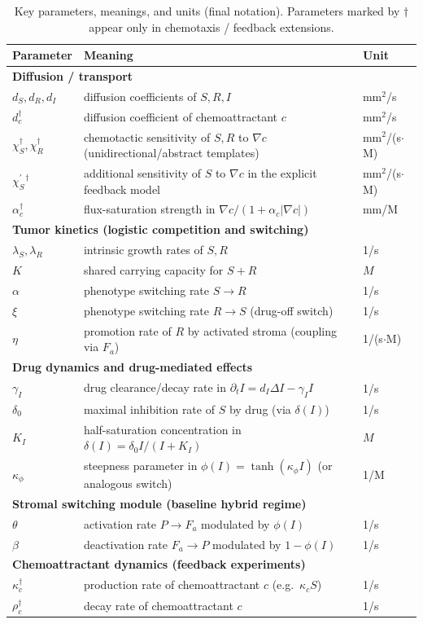 \documentclass[pdflatex,sn-mathphys-ay]{sn-jnl}
\theoremstyle{thmstyleone}
\theoremstyle{definition}
\theoremstyle{remark}
\begin{document}
\begin{table}[htbp]
\centering
\caption{Key parameters, meanings, and units (final notation). Parameters marked by $\dagger$ appear only in chemotaxis / feedback extensions.}
\label{tab:parameter_units}
\begin{tabular}{lll}
\toprule
Parameter & Meaning & Unit \\
\midrule
\multicolumn{3}{l}{\textbf{Diffusion / transport}}\\
$d_S,d_R,d_I$ & diffusion coefficients of $S,R,I$ & mm$^2$/s \\
$d_c^\dagger$ & diffusion coefficient of chemoattractant $c$ & mm$^2$/s \\
$\chi_S^\dagger,\chi_R^\dagger$ & chemotactic sensitivity of $S,R$ to $\nabla c$ (unidirectional/abstract templates) & mm$^2$/(s$\cdot$M) \\
$\chi_S^{\prime\,\dagger}$ & additional sensitivity of $S$ to $\nabla c$ in the explicit feedback model & mm$^2$/(s$\cdot$M) \\
$\alpha_c^\dagger$ & flux-saturation strength in $\nabla c/(1+\alpha_c|\nabla c|)$ & mm/M \\
\midrule
\multicolumn{3}{l}{\textbf{Tumor kinetics (logistic competition and switching)}}\\
$\lambda_S,\lambda_R$ & intrinsic growth rates of $S,R$ & 1/s \\
$K$ & shared carrying capacity for $S+R$ & $M$ \\
$\alpha$ & phenotype switching rate $S\to R$ & 1/s \\
$\xi$ & phenotype switching rate $R\to S$ (drug-off switch) & 1/s \\
$\eta$ & promotion rate of $R$ by activated stroma (coupling via $F_a$) & 1/(s$\cdot$M) \\
\midrule
\multicolumn{3}{l}{\textbf{Drug dynamics and drug-mediated effects}}\\
$\gamma_I$ & drug clearance/decay rate in $\partial_t I=d_I\Delta I-\gamma_I I$ & 1/s \\
$\delta_0$ & maximal inhibition rate of $S$ by drug (via $\delta(I)$) & 1/s \\
$K_I$ & half-saturation concentration in $\delta(I)=\delta_0 I/(I+K_I)$ & $M$ \\
$\kappa_\phi$ & steepness parameter in $\phi(I)=\tanh(\kappa_\phi I)$ (or analogous switch) & 1/M \\
\midrule
\multicolumn{3}{l}{\textbf{Stromal switching module (baseline hybrid regime)}}\\
$\theta$ & activation rate $P\to F_a$ modulated by $\phi(I)$ & 1/s \\
$\beta$ & deactivation rate $F_a\to P$ modulated by $1-\phi(I)$ & 1/s \\
\midrule
\multicolumn{3}{l}{\textbf{Chemoattractant dynamics (feedback experiments)}}\\
$\kappa_c^\dagger$ & production rate of chemoattractant $c$ (e.g.\ $\kappa_c S$) & 1/s \\
$\rho_c^\dagger$ & decay rate of chemoattractant $c$ & 1/s \\
\bottomrule
\end{tabular}
\end{table}
\end{document}
